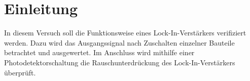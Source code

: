 \section{Einleitung}
In diesem Versuch soll die Funktionsweise eines Lock-In-Verstärkers verifiziert werden. Dazu wird das Ausgangssignal nach Zuschalten einzelner Bauteile betrachtet und ausgewertet. Im Anschluss wird mithilfe einer Photodetektorschaltung die Rauschunterdrückung des Lock-In-Verstärkers überprüft.